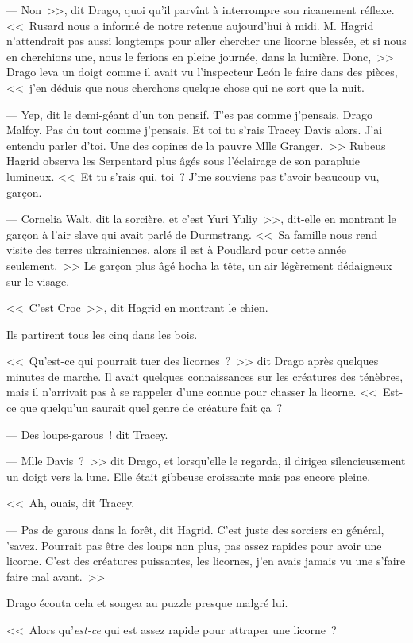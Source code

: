 --- Non~>>, dit Drago, quoi qu'il parvînt à interrompre son ricanement réflexe. <<~Rusard nous a informé de notre retenue aujourd'hui à midi. M. Hagrid n'attendrait pas aussi longtemps pour aller chercher une licorne blessée, et si nous en cherchions une, nous le ferions en pleine journée, dans la lumière. Donc,~>> Drago leva un doigt comme il avait vu l'inspecteur León le faire dans des pièces, <<~j'en déduis que nous cherchons quelque chose qui ne sort que la nuit.

--- Yep, dit le demi-géant d'un ton pensif. T'es pas comme j'pensais, Drago Malfoy. Pas du tout comme j'pensais. Et toi tu s'rais Tracey Davis alors. J'ai entendu parler d'toi. Une des copines de la pauvre Mlle Granger.~>> Rubeus Hagrid observa les Serpentard plus âgés sous l'éclairage de son parapluie lumineux. <<~Et tu s'rais qui, toi~? J'me souviens pas t'avoir beaucoup vu, garçon.

--- Cornelia Walt, dit la sorcière, et c'est Yuri Yuliy~>>, dit-elle en montrant le garçon à l'air slave qui avait parlé de Durmstrang. <<~Sa famille nous rend visite des terres ukrainiennes, alors il est à Poudlard pour cette année seulement.~>> Le garçon plus âgé hocha la tête, un air légèrement dédaigneux sur le visage.

<<~C'est Croc~>>, dit Hagrid en montrant le chien.

Ils partirent tous les cinq dans les bois.

<<~Qu'est-ce qui pourrait tuer des licornes~?~>> dit Drago après quelques minutes de marche. Il avait quelques connaissances sur les créatures des ténèbres, mais il n'arrivait pas à se rappeler d'une connue pour chasser la licorne. <<~Est-ce que quelqu'un saurait quel genre de créature fait ça~?

--- Des loups-garous~! dit Tracey.

--- Mlle Davis~?~>> dit Drago, et lorsqu'elle le regarda, il dirigea silencieusement un doigt vers la lune. Elle était gibbeuse croissante mais pas encore pleine.

<<~Ah, ouais, dit Tracey.

--- Pas de garous dans la forêt, dit Hagrid. C'est juste des sorciers en général, 'savez. Pourrait pas être des loups non plus, pas assez rapides pour avoir une licorne. C'est des créatures puissantes, les licornes, j'en avais jamais vu une s'faire faire mal avant.~>>

Drago écouta cela et songea au puzzle presque malgré lui.

<<~Alors qu'\emph{est-ce} qui est assez rapide pour attraper une licorne~?

